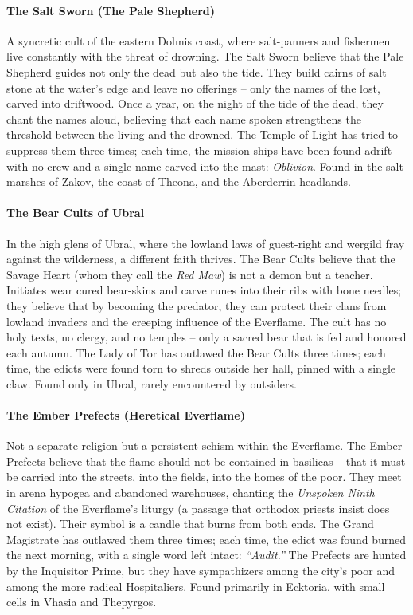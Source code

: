 \paragraph{The Salt Sworn (The Pale Shepherd)}
A syncretic cult of the eastern Dolmis coast, where salt-panners and fishermen live constantly with the threat of drowning. The Salt Sworn believe that the Pale Shepherd guides not only the dead but also the tide. They build cairns of salt stone at the water's edge and leave no offerings -- only the names of the lost, carved into driftwood. Once a year, on the night of the tide of the dead, they chant the names aloud, believing that each name spoken strengthens the threshold between the living and the drowned. The Temple of Light has tried to suppress them three times; each time, the mission ships have been found adrift with no crew and a single name carved into the mast: \textit{Oblivion}. Found in the salt marshes of Zakov, the coast of Theona, and the Aberderrin headlands.

\paragraph{The Bear Cults of Ubral}
In the high glens of Ubral, where the lowland laws of guest-right and wergild fray against the wilderness, a different faith thrives. The Bear Cults believe that the Savage Heart (whom they call the \textit{Red Maw}) is not a demon but a teacher. Initiates wear cured bear-skins and carve runes into their ribs with bone needles; they believe that by becoming the predator, they can protect their clans from lowland invaders and the creeping influence of the Everflame. The cult has no holy texts, no clergy, and no temples -- only a sacred bear that is fed and honored each autumn. The Lady of Tor has outlawed the Bear Cults three times; each time, the edicts were found torn to shreds outside her hall, pinned with a single claw. Found only in Ubral, rarely encountered by outsiders.

\paragraph{The Ember Prefects (Heretical Everflame)}
Not a separate religion but a persistent schism within the Everflame. The Ember Prefects believe that the flame should not be contained in basilicas -- that it must be carried into the streets, into the fields, into the homes of the poor. They meet in arena hypogea and abandoned warehouses, chanting the \textit{Unspoken Ninth Citation} of the Everflame's liturgy (a passage that orthodox priests insist does not exist). Their symbol is a candle that burns from both ends. The Grand Magistrate has outlawed them three times; each time, the edict was found burned the next morning, with a single word left intact: \textit{``Audit.''} The Prefects are hunted by the Inquisitor Prime, but they have sympathizers among the city's poor and among the more radical Hospitaliers. Found primarily in Ecktoria, with small cells in Vhasia and Thepyrgos.


